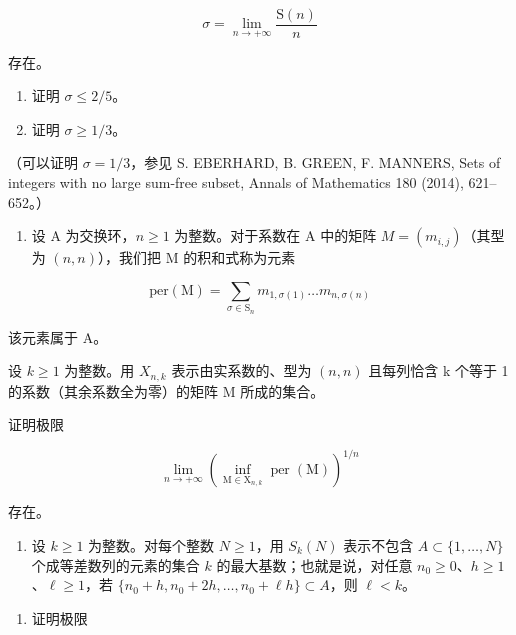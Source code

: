 \[
\sigma = \lim _ {n \to + \infty} \frac {\mathrm{S} (n)}{n}
\]

存在。

\begin{enumerate}
\def\labelenumi{\alph{enumi})}
\setcounter{enumi}{1}
\item
  证明 \(\sigma \leqslant 2 / 5\)。
\item
  证明 \(\sigma \geqslant 1 / 3\)。
\end{enumerate}

（可以证明 \(\sigma = 1/3\)，参见 S. EBERHARD, B. GREEN, F. MANNERS, Sets of integers with no large sum-free subset, Annals of Mathematics 180 (2014), 621--652。）

\begin{enumerate}
\def\labelenumi{\arabic{enumi})}
\setcounter{enumi}{4}
\tightlist
\item
  设 A 为交换环，\(n \geqslant 1\) 为整数。对于系数在 A 中的矩阵 \(M = (m_{i,j})\)（其型为 \((n, n)\)），我们把 M 的积和式称为元素
\end{enumerate}

\[
\mathrm{per(M)} = \sum_ {\sigma \in \mathrm{S} _ {n}} m _ {1, \sigma (1)} \dots m _ {n, \sigma (n)}
\]

该元素属于 A。

设 \(k \geqslant 1\) 为整数。用 \(X_{n,k}\) 表示由实系数的、型为 \((n, n)\) 且每列恰含 k 个等于 1 的系数（其余系数全为零）的矩阵 M 所成的集合。

证明极限

\[
\lim _ {n \to + \infty} \left(\inf _ {\mathrm{M} \in \mathrm{X} _ {n, k}} \operatorname{per} (\mathrm{M})\right) ^ {1 / n}
\]

存在。

\begin{enumerate}
\def\labelenumi{\arabic{enumi})}
\setcounter{enumi}{5}
\tightlist
\item
  设 \(k \geqslant 1\) 为整数。对每个整数 \(N \geqslant 1\)，用 \(S_k(N)\) 表示不包含 \(A \subset \{1, \ldots, N\}\) 个成等差数列的元素的集合 \(k\) 的最大基数；也就是说，对任意 \(n_0 \geqslant 0\)、\(h \geqslant 1\)、\(\ell \geqslant 1\)，若 \(\{n_0 + h, n_0 + 2h, \ldots, n_0 + \ell h\} \subset A\)，则 \(\ell < k\)。
\end{enumerate}

\begin{enumerate}
\def\labelenumi{\alph{enumi})}
\tightlist
\item
  证明极限
\end{enumerate}


